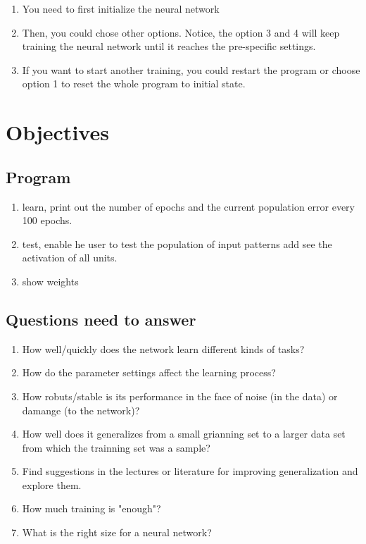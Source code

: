 \documentclass[11pt]{article}
\begin{document}
\begin{enumerate}
\item You need to first initialize the neural network
\item Then, you could chose other options. Notice, the option 3 and 4 will keep training the neural network until it reaches the pre-specific settings.
\item If you want to start another training, you could restart the program or choose option 1 to reset the whole program to initial state.
\end{enumerate}

\section{Objectives}
\label{sec-6}
\subsection{Program}
\label{sec-6-1}
\begin{enumerate}
\item learn, print out the number of epochs and the current population error every 100 epochs.
\item test, enable he user to test the population of input patterns add see the activation of all units.
\item show weights
\end{enumerate}

\subsection{Questions need to answer}
\label{sec-6-2}
\begin{enumerate}
\item How well/quickly does the network learn different kinds of tasks?
\item How do the parameter settings affect the learning process?
\item How robuts/stable is its performance in the face of noise (in the data) or damange (to the network)?
\item How well does it generalizes from a small grianning set to a larger data set from which the trainning set was a sample?
\item Find suggestions in the lectures or literature for improving generalization and explore them.
\item How much training is "enough"?
\item What is the right size for a neural network?
\end{enumerate}
\end{document}
